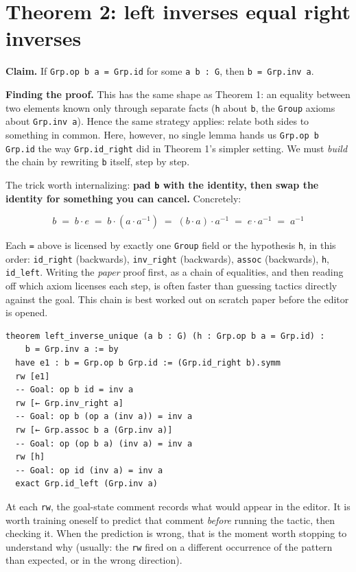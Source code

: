 \section{Theorem 2: left inverses equal right inverses}\label{sec:07-group-theorems:03-theorem-2:1}

\textbf{Claim.} If \texttt{Grp.op b a = Grp.id} for some \texttt{a b : G}, then \texttt{b = Grp.inv a}.

\textbf{Finding the proof.} This has the same shape as Theorem 1: an equality between two elements known only through separate facts (\texttt{h} about \texttt{b}, the \texttt{Group} axioms about \texttt{Grp.inv a}). Hence the same strategy applies: relate both sides to something in common. Here, however, no single lemma hands us \texttt{Grp.op b Grp.id} the way \texttt{Grp.id\_\allowbreak{}right} did in Theorem 1's simpler setting. We must \emph{build} the chain by rewriting \texttt{b} itself, step by step.

The trick worth internalizing: \textbf{pad \texttt{b} with the identity, then swap the identity for something you can cancel.} Concretely:

\[
b \;=\; b \cdot e \;=\; b \cdot (a \cdot a^{-1}) \;=\; (b \cdot a) \cdot a^{-1} \;=\; e \cdot a^{-1} \;=\; a^{-1}
\]

Each \texttt{=} above is licensed by exactly one \texttt{Group} field or the hypothesis \texttt{h}, in this order: \texttt{id\_\allowbreak{}right} (backwards), \texttt{inv\_\allowbreak{}right} (backwards), \texttt{assoc} (backwards), \texttt{h}, \texttt{id\_\allowbreak{}left}. Writing the \emph{paper} proof first, as a chain of equalities, and then reading off which axiom licenses each step, is often faster than guessing tactics directly against the goal. This chain is best worked out on scratch paper before the editor is opened.

\begin{lstlisting}
theorem left_inverse_unique (a b : G) (h : Grp.op b a = Grp.id) :
    b = Grp.inv a := by
  have e1 : b = Grp.op b Grp.id := (Grp.id_right b).symm
  rw [e1]
  -- Goal: op b id = inv a
  rw [← Grp.inv_right a]
  -- Goal: op b (op a (inv a)) = inv a
  rw [← Grp.assoc b a (Grp.inv a)]
  -- Goal: op (op b a) (inv a) = inv a
  rw [h]
  -- Goal: op id (inv a) = inv a
  exact Grp.id_left (Grp.inv a)
\end{lstlisting}

At each \texttt{rw}, the goal-state comment records what would appear in the editor. It is worth training oneself to predict that comment \emph{before} running the tactic, then checking it. When the prediction is wrong, that is the moment worth stopping to understand why (usually: the \texttt{rw} fired on a different occurrence of the pattern than expected, or in the wrong direction).

